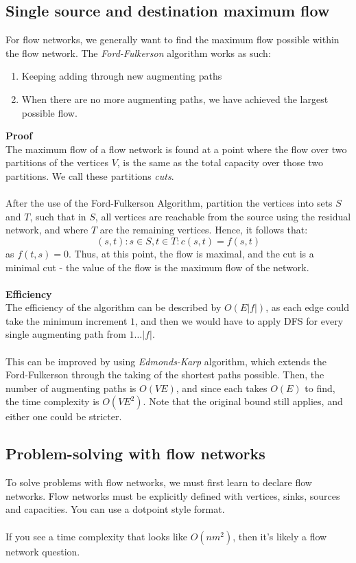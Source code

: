 \documentclass[journal, letterpaper]{IEEEtran}
\begin{document}
  \subsection{Single source and destination maximum flow}
  For flow networks, we generally want to find the maximum flow possible within the flow network. The \emph{Ford-Fulkerson} algorithm
  works as such:
  \begin{enumerate}
    \item Keeping adding through new augmenting paths
    \item When there are no more augmenting paths, we have achieved the largest possible flow.
  \end{enumerate}
  \textbf{Proof} \\
  The maximum flow of a flow network is found at a point where the flow over two partitions of the vertices $V$, is the same
  as the total capacity over those two partitions. We call these partitions \emph{cuts}. \\ \\  After the use of the Ford-Fulkerson
  Algorithm, partition the vertices into sets $S$ and $T$, such that in $S$, all vertices are reachable from the source
  using the residual network, and where $T$ are the remaining vertices. Hence, it follows that:
  \[ (s, t) : s \in S, t \in T : c(s, t) = f(s, t) \]
  as $f(t, s) = 0$. Thus, at this point, the flow is maximal, and the cut is a minimal cut - the value of the flow is the
  maximum flow of the network. \\\\
  \textbf{Efficiency} \\ 
  The efficiency of the algorithm can be described by $O(E|f|)$, as each edge could take the minimum increment $1$, and then
  we would have to apply DFS for every single augmenting path from $1 \ldots |f|$. \\ \\ 
  This can be improved by using \emph{Edmonds-Karp} algorithm, which extends the Ford-Fulkerson through the taking of
  the shortest paths possible. Then, the number of augmenting paths is $O(VE)$, and since each takes $O(E)$ to find,
  the time complexity is $O(VE^2)$. Note that the original bound still applies, and either one could be stricter.

  \subsection{Problem-solving with flow networks}
  To solve problems with flow networks, we must first learn to declare flow networks. Flow networks must be
  explicitly defined with vertices, sinks, sources and capacities. You can use a dotpoint style format. \\ \\ 
  If you see a time complexity that looks like $O(nm^2)$, then it's likely a flow network question.
\end{document}

